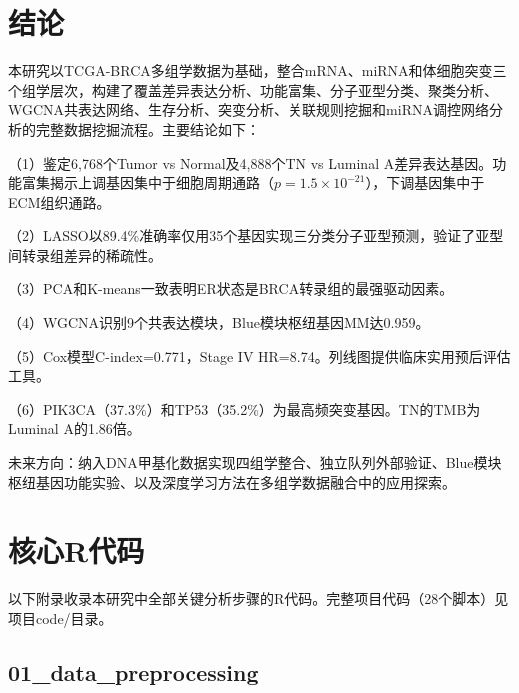 \documentclass[12pt,a4paper]{ctexart}
\begin{document}
\section{结论}

本研究以TCGA-BRCA多组学数据为基础，整合mRNA、miRNA和体细胞突变三个组学层次，构建了覆盖差异表达分析、功能富集、分子亚型分类、聚类分析、WGCNA共表达网络、生存分析、突变分析、关联规则挖掘和miRNA调控网络分析的完整数据挖掘流程。主要结论如下：

（1）鉴定6,768个Tumor vs Normal及4,888个TN vs Luminal A差异表达基因。功能富集揭示上调基因集中于细胞周期通路（$p=1.5\times10^{-21}$），下调基因集中于ECM组织通路。

（2）LASSO以89.4\%准确率仅用35个基因实现三分类分子亚型预测，验证了亚型间转录组差异的稀疏性。

（3）PCA和K-means一致表明ER状态是BRCA转录组的最强驱动因素。

（4）WGCNA识别9个共表达模块，Blue模块枢纽基因MM达0.959。

（5）Cox模型C-index=0.771，Stage IV HR=8.74。列线图提供临床实用预后评估工具。

（6）PIK3CA（37.3\%）和TP53（35.2\%）为最高频突变基因。TN的TMB为Luminal A的1.86倍。

未来方向：纳入DNA甲基化数据实现四组学整合、独立队列外部验证、Blue模块枢纽基因功能实验、以及深度学习方法在多组学数据融合中的应用探索。

\printbibliography

\newpage
\appendix
\section{核心R代码}

以下附录收录本研究中全部关键分析步骤的R代码。完整项目代码（28个脚本）见项目code/目录。


\subsection{01_data_preprocessing}
\end{document}
